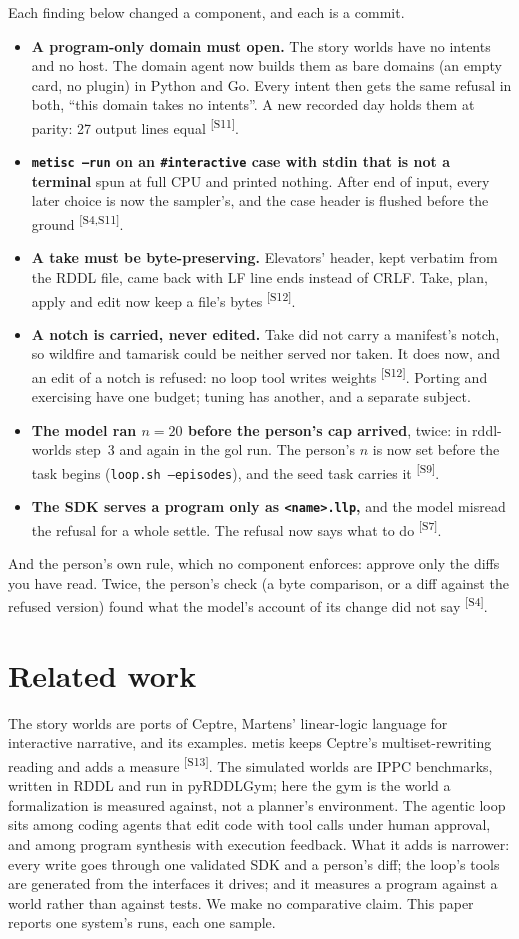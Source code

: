 \documentclass[11pt]{article}
\newcommand{\src}[1]{\textsuperscript{[#1]}}
\begin{document}
Each finding below changed a component, and each is a commit.
\begin{itemize}[nosep]
\item \textbf{A program-only domain must open.} The story worlds have no
  intents and no host. The domain agent now builds them as bare domains
  (an empty card, no plugin) in Python and Go. Every intent then gets the
  same refusal in both, ``this domain takes no intents''. A new recorded
  day holds them at parity: 27 output lines equal \src{S11}.
\item \textbf{\texttt{metisc --run} on an \texttt{\#interactive} case with
  stdin that is not a terminal} spun at full CPU and printed nothing.
  After end of input, every later choice is now the sampler's, and the
  case header is flushed before the ground \src{S4,S11}.
\item \textbf{A take must be byte-preserving.} Elevators' header, kept
  verbatim from the RDDL file, came back with LF line ends instead of CRLF.
  Take, plan, apply and edit now keep a file's bytes \src{S12}.
\item \textbf{A notch is carried, never edited.} Take did not carry a
  manifest's notch, so wildfire and tamarisk could be neither served nor
  taken. It does now, and an edit of a notch is refused: no loop tool
  writes weights \src{S12}. Porting and exercising have one budget;
  tuning has another, and a separate subject.
\item \textbf{The model ran $n=20$ before the person's cap arrived}, twice:
  in rddl-worlds step~3 and again in the gol run. The person's $n$ is now
  set before the task begins (\texttt{loop.sh --episodes}), and the seed
  task carries it \src{S9}.
\item \textbf{The SDK serves a program only as \texttt{<name>.llp},} and
  the model misread the refusal for a whole settle. The refusal now says
  what to do \src{S7}.
\end{itemize}
And the person's own rule, which no component enforces: approve only the
diffs you have read. Twice, the person's check (a byte comparison, or a
diff against the refused version) found what the model's account of its
change did not say \src{S4}.

\section{Related work}\label{sec:related}

The story worlds are ports of Ceptre, Martens' linear-logic language for
interactive narrative, and its examples. metis keeps Ceptre's
multiset-rewriting reading and adds a measure \src{S13}. The simulated
worlds are IPPC benchmarks, written in RDDL and run in pyRDDLGym; here the
gym is the world a formalization is measured against, not a planner's
environment. The agentic loop sits among coding agents that edit code with
tool calls under human approval, and among program synthesis with
execution feedback. What it adds is narrower: every write goes through one
validated SDK and a person's diff; the loop's tools are generated from the
interfaces it drives; and it measures a program against a world rather
than against tests. We make no comparative claim. This paper reports one
system's runs, each one sample.
\end{document}
